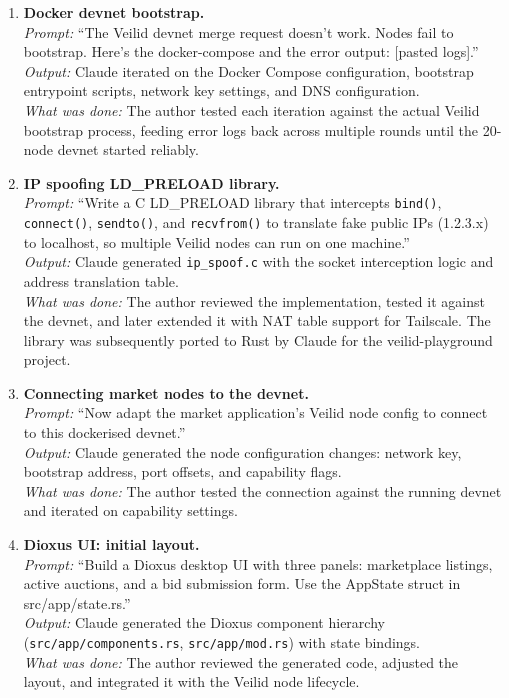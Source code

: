 \begin{enumerate}
  \item \textbf{Docker devnet bootstrap.}\\
    \textit{Prompt:} ``The Veilid devnet merge request doesn't work.
    Nodes fail to bootstrap.  Here's the docker-compose and the error
    output: [pasted logs].''\\
    \textit{Output:} Claude iterated on the Docker Compose configuration,
    bootstrap entrypoint scripts, network key settings, and DNS
    configuration.\\
    \textit{What was done:} The author tested each iteration against the
    actual Veilid bootstrap process, feeding error logs back across
    multiple rounds until the 20-node devnet started reliably.

  \item \textbf{IP spoofing LD\_PRELOAD library.}\\
    \textit{Prompt:} ``Write a C LD\_PRELOAD library that intercepts
    \texttt{bind()}, \texttt{connect()}, \texttt{sendto()}, and
    \texttt{recvfrom()} to translate fake public IPs (1.2.3.x) to
    localhost, so multiple Veilid nodes can run on one machine.''\\
    \textit{Output:} Claude generated \texttt{ip\_spoof.c} with the
    socket interception logic and address translation table.\\
    \textit{What was done:} The author reviewed the implementation,
    tested it against the devnet, and later extended it with NAT table
    support for Tailscale.  The library was subsequently ported to Rust
    by Claude for the veilid-playground project.

  \item \textbf{Connecting market nodes to the devnet.}\\
    \textit{Prompt:} ``Now adapt the market application's Veilid node
    config to connect to this dockerised devnet.''\\
    \textit{Output:} Claude generated the node configuration changes:
    network key, bootstrap address, port offsets, and capability flags.\\
    \textit{What was done:} The author tested the connection against the
    running devnet and iterated on capability settings.

  \item \textbf{Dioxus UI: initial layout.}\\
    \textit{Prompt:} ``Build a Dioxus desktop UI with three panels:
    marketplace listings, active auctions, and a bid submission form.
    Use the AppState struct in src/app/state.rs.''\\
    \textit{Output:} Claude generated the Dioxus component hierarchy
    (\texttt{src/app/components.rs}, \texttt{src/app/mod.rs}) with
    state bindings.\\
    \textit{What was done:} The author reviewed the generated code,
    adjusted the layout, and integrated it with the Veilid node
    lifecycle.


\end{enumerate}
